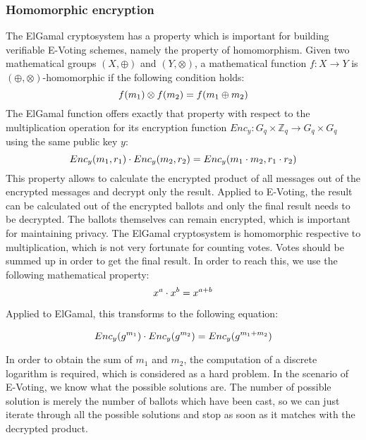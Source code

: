 \documentclass[numbers=noenddot, abstract=on, a4paper, headsepline,
footsepline, oneside, draft=off]{scrreprt}
\begin{document}
\subsubsection{Homomorphic encryption}
\label{sec:homenc}
The ElGamal cryptosystem has a property
which is important for building verifiable E-Voting schemes, namely the property
of homomorphism. Given two mathematical groups $(X,\oplus)$ and $(Y,\otimes)$, a
mathematical function $f:X \rightarrow Y$ is $(\oplus, \otimes)$-homomorphic if
the following condition holds:
\begin{equation}
f(m_1) \otimes f(m_2) = f(m_1 \oplus m_2) \notag
\end{equation}
The ElGamal function offers exactly that property with respect to the
multiplication operation for its encryption function $Enc_y:G_q \times
\mathbb{Z}_q \rightarrow G_q \times G_q$ using the same public key $y$:
\begin{equation}
Enc_y(m_1, r_1) \cdot Enc_y(m_2, r_2) = Enc_y(m_1 \cdot m_2, r_1 \cdot r_2)
\notag
\end{equation}
This property allows to calculate the encrypted product of all messages out of
the encrypted messages and decrypt only the result. Applied to E-Voting, the
result can be calculated out of the encrypted ballots and only the final result
needs to be decrypted. The ballots themselves can remain encrypted, which is
important for maintaining privacy. The ElGamal cryptosystem is homomorphic
respective to multiplication, which is not very fortunate for counting votes.
Votes should be summed up in order to get the final result. In order to reach
this, we use the following mathematical property:
\begin{equation}
x^a \cdot x^b = x^{a+b} \notag
\end{equation}

Applied to ElGamal, this transforms to the following equation:

\begin{equation}
Enc_y(g^{m_1}) \cdot Enc_y(g^{m_2}) = Enc_y(g^{m_1 + m_2}) \notag
\end{equation}

In order to obtain the sum of $m_1$ and $m_2$, the computation of a discrete
logarithm is required, which is considered as a hard problem. In the scenario of
E-Voting, we know what the possible solutions are. The number of possible
solution is merely the number of ballots which have been cast, so we can just
iterate through all the possible solutions and stop as soon as it matches with
the decrypted product.
\end{document}
